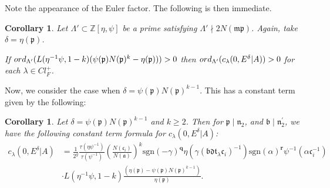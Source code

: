 \documentclass[a4paper,oneside]{amsart}
\theoremstyle{plain}
\newtheorem{cor}[thm]{Corollary}
\theoremstyle{definition}
\begin{document}
Note the appearance of the Euler factor. The following is then immediate.

\begin{cor}\label{modpcuspform} Let $\Lambda'\subset\mathbb{Z}[\eta,\psi]$ be a prime satisfying $\Lambda'\nmid 2N(\mathfrak{mp})$. Again, take $\delta = \eta(\mathfrak{p})$.

If $\textnormal{ord}_{\Lambda'}(L(\eta^{-1}\psi,1-k)(\psi(\mathfrak{p})N(\mathfrak{p})^k-\eta(\mathfrak{p}))) > 0$ then $\textnormal{ord}_{\Lambda'}(c_{\lambda}(0,E^\delta|A)) > 0$ for each $\lambda\in Cl^{+}_F$. 
\end{cor}

Now, we consider the case when $\delta = \psi(\mathfrak{p})N(\mathfrak{p})^{k-1}$. This has a constant term given by the following:

\begin{cor}
\label{cor:Eprime}
    Let $\delta = \psi(\mathfrak{p})N(\mathfrak{p})^{k-1}$ and $k\geq 2$. Then for $\mathfrak{p} \mid \mathfrak{n}_2$, and $\mathfrak{b} \mid \mathfrak{n}_2^\prime$, we have the following constant term formula for $c_{\lambda}(0,E^\delta|A)$:
    \begin{align*}
    c_{\lambda}(0,E^\delta|A) &= \frac{1}{2^g}\frac{\tau(\eta\psi^{-1})}{\tau(\psi^{-1})}\left(\frac{N(\mathfrak{c}_i)}{N(\mathfrak{a})}\right)^k\text{sgn}(-\gamma)^{\textbf{q}}\eta(\gamma(\mathfrak{bdt}_{\lambda}\mathfrak{c}_i)^{-1})\text{sgn}(\alpha)^{\textbf{r}}\psi^{-1}(\alpha\mathfrak{c}_i^{-1})\\ 
    &\cdot L(\eta^{-1}\psi,1-k)\frac{(\eta(\mathfrak{p}) - \psi(\mathfrak{p})N(\mathfrak{p})^{k-1})}{\eta(\mathfrak{p})}.
    \end{align*}
\end{cor}
\end{document}
